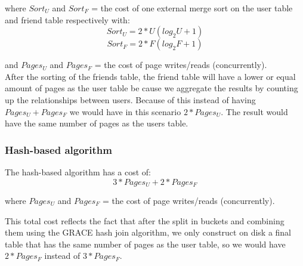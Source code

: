 \documentclass{article}      %
\begin{document}
where  \begin{math}Sort_U \end{math} and \begin{math}Sort_F \end{math} = the cost of one external merge sort on the user table and friend table respectively with:
\begin{equation}
Sort_U = 2*U(log_2U + 1)
\end{equation}
\begin{equation}
Sort_F = 2*F(log_2F + 1)
\end{equation}

and \begin{math}Pages_U \end{math} and \begin{math}Pages_F \end{math}  = the cost of page writes/reads (concurrently).\\

After the sorting of the friends table, the friend table will have a lower or equal amount of pages as the user table be cause we aggregate the results by counting up the relationships between users. Because of this instead of having \begin{math}Pages_U + Pages_F \end{math} we would have in this scenario \begin{math}2 * Pages_U\end{math}. The result would have the same number of pages as the users table.\\



\subsubsection* {Hash-based algorithm}

The hash-based algorithm has a cost of:
\begin{equation}
3 * Pages_U + 2 * Pages_F
\end{equation}

where \begin{math}Pages_U\end{math} and \begin{math}Pages_F\end{math}  = the cost of page writes/reads (concurrently).

This total cost reflects the fact that after the split in buckets and combining them using the GRACE hash join algorithm, we only construct on disk a final table that has the same number of pages as the user table, so we would have \begin{math}2 * Pages_F\end{math} instead of \begin{math}3 * Pages_F\end{math}.\\
\end{document}
